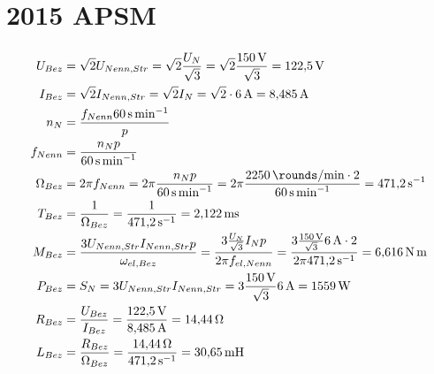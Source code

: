 \documentclass[11pt,a4paper]{scrartcl}
\newcommand{\0}{_{\mybr{0}}}
\newcommand{\1}{_{\mybr{1}}}
\newcommand{\2}{_{\mybr{2}}}
\begin{document}
\clearpage
\part{2015 APSM}
\section{}
\begin{align}
	U_{Bez}&=\sqrt{2}U_{Nenn,Str}=\sqrt{2}\frac{U_N}{\sqrt{3}}=\sqrt{2}\frac{\SI{150}{\volt}}{\sqrt{3}}=\SI{122.5}{\volt}\\
	I_{Bez}&=\sqrt{2}I_{Nenn,Str}=\sqrt{2}I_N=\sqrt{2}\cdot\SI{6}{\ampere}=\SI{8.485}{\ampere}\\
	n_N&=\frac{f_{Nenn}\SI{60}{\second\per\minute}}{p}\\
	f_{Nenn}&=\frac{n_N p}{\SI{60}{\second\per\minute}}\\
	\Omega_{Bez}&=2\pi f_{Nenn}=2\pi\frac{n_N p}{\SI{60}{\second\per\minute}}=2\pi\frac{\SI{2250}{\rounds\per\minute}\cdot 2}{\SI{60}{\second\per\minute}}=\SI{471.2}{\per\second}\\
	T_{Bez}&=\frac{1}{\Omega_{Bez}}=\frac{1}{\SI{471.2}{\per\second}}=\SI{2.122}{\milli\second}\\
	M_{Bez}&=\frac{3 U_{Nenn,Str}I_{Nenn,Str}p}{\omega_{el,Bez}}=\frac{3 \frac{U_N}{\sqrt{3}}I_{N}p}{2\pi f_{el,Nenn}}=\frac{3\frac{\SI{150}{\volt}}{\sqrt{3}}\SI{6}{\ampere}\cdot 2}{2\pi\SI{471.2}{\per\second}}=\SI{6.616}{\newton\metre}\\
	P_{Bez}&=S_N=3 U_{Nenn,Str} I_{Nenn,Str}=3\frac{\SI{150}{\volt}}{\sqrt{3}}\SI{6}{\ampere}=\SI{1559}{\watt}\\
	R_{Bez}&=\frac{U_{Bez}}{I_{Bez}}=\frac{\SI{122.5}{\volt}}{\SI{8.485}{\ampere}}=\SI{14.44}{\ohm}\\
	L_{Bez}&=\frac{R_{Bez}}{\Omega_{Bez}}=\frac{\SI{14.44}{\ohm}}{\SI{471.2}{\per\second}}=\SI{30.65}{\milli\henry}
\end{align}
\end{document}
